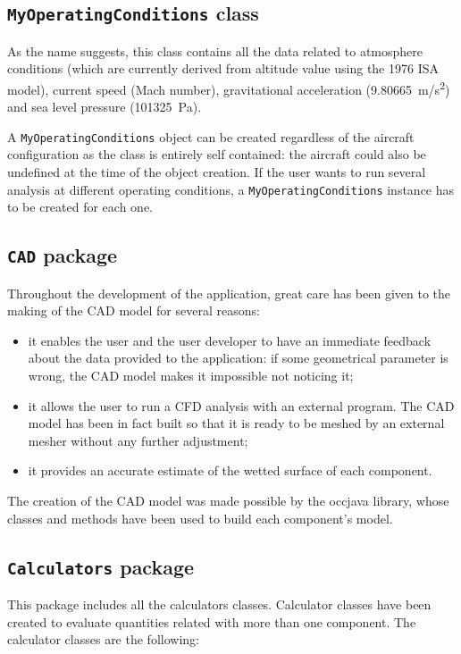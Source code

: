 \subsection{\texttt{MyOperatingConditions} class}
As the name suggests, this class contains all the data related to atmosphere conditions (which are currently derived from altitude value using the 1976 ISA model), current speed (Mach number), gravitational acceleration (\SI{9.80665 }{\meter/\second^2}) and sea level pressure (\SI{101325}{\Pa}).

A \texttt{MyOperatingConditions} object can be created regardless of the aircraft configuration as the class is entirely self contained: the aircraft could also be undefined at the time of the object creation. If the user wants to run several analysis at different operating conditions, a \texttt{MyOperatingConditions} instance has to be created for each one.

\subsection{\texttt{CAD} package}

Throughout the development of the application, great care has been given to the making of the CAD model for several reasons:
\begin{itemize}
	\item it enables the user and the user developer to have an immediate feedback about the data provided to the application: if some geometrical parameter is wrong, the CAD model makes it impossible not noticing it;
	\item it allows the user to run a CFD analysis with an external program. The CAD model has been in fact built so that it is ready to be meshed by an external mesher without any further adjustment;
	\item it provides an accurate estimate of the wetted surface of each component.
\end{itemize}

The creation of the CAD model was made possible by the occjava library, whose classes and methods have been used to build each component's model.

 \subsection{\texttt{Calculators} package}
 This package includes all the calculators classes. Calculator classes have been created to evaluate quantities related with more than one component. The calculator classes are the following:
 
